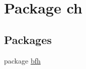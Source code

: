 \hypertarget{namespacech}{}\section{Package ch}
\label{namespacech}
\subsection*{Packages}
\begin{DoxyCompactItemize}
\item 
package \hyperlink{namespacech_1_1bfh}{bfh}
\end{DoxyCompactItemize}
